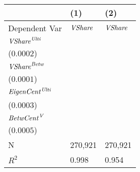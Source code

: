 \begin{tabular}{lll}
\toprule
 & (1) & (2) \\
\midrule
Dependent Var & ${\it VShare}$ & ${\it VShare}$ \\
${\it {VShare}^{\it Ulti}}$ & \makecell{$0.8898^{***}$ \\ ($0.0002$)} & \makecell{} \\
${\it VShare}^{\it Betw}$ & \makecell{$0.0993^{***}$ \\ ($0.0001$)} & \makecell{} \\
${\it EigenCent^{\it Ulti}}$ & \makecell{} & \makecell{$0.4247^{***}$ \\ ($0.0003$)} \\
${\it BetwCent}^{\it V}$ & \makecell{} & \makecell{$0.2657^{***}$ \\ ($0.0005$)} \\
\midrule N & 270,921 & 270,921 \\
$R^2$ & 0.998 & 0.954 \\
\bottomrule
\end{tabular}
